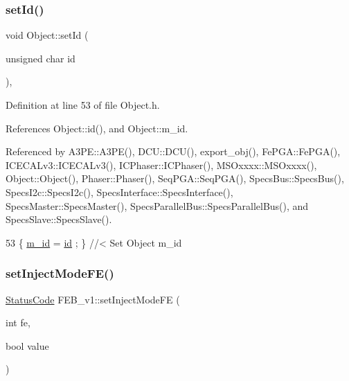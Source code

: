 \subsubsection{\texorpdfstring{set\+Id()}{setId()}}
{\footnotesize\ttfamily void Object\+::set\+Id (\begin{DoxyParamCaption}\item[{unsigned char}]{id }\end{DoxyParamCaption})\hspace{0.3cm}{\ttfamily [inline]}, {\ttfamily [inherited]}}



Definition at line 53 of file Object.\+h.



References Object\+::id(), and Object\+::m\+\_\+id.



Referenced by A3\+P\+E\+::\+A3\+P\+E(), D\+C\+U\+::\+D\+C\+U(), export\+\_\+obj(), Fe\+P\+G\+A\+::\+Fe\+P\+G\+A(), I\+C\+E\+C\+A\+Lv3\+::\+I\+C\+E\+C\+A\+Lv3(), I\+C\+Phaser\+::\+I\+C\+Phaser(), M\+S\+Oxxxx\+::\+M\+S\+Oxxxx(), Object\+::\+Object(), Phaser\+::\+Phaser(), Seq\+P\+G\+A\+::\+Seq\+P\+G\+A(), Specs\+Bus\+::\+Specs\+Bus(), Specs\+I2c\+::\+Specs\+I2c(), Specs\+Interface\+::\+Specs\+Interface(), Specs\+Master\+::\+Specs\+Master(), Specs\+Parallel\+Bus\+::\+Specs\+Parallel\+Bus(), and Specs\+Slave\+::\+Specs\+Slave().


\begin{DoxyCode}
53 \{ \hyperlink{classObject_aca74b9dbfed7b5556ea2d56c65b6b6b0}{m\_id}    = \hyperlink{classObject_af99145335cc61ff6e2798ea17db009d2}{id}    ; \} \textcolor{comment}{//< Set Object m\_id}
\end{DoxyCode}
\mbox{\label{classFEB__v1_aea3983d847c7b8053485ddd16af65680}} 
\subsubsection{\texorpdfstring{set\+Inject\+Mode\+F\+E()}{setInjectModeFE()}}
{\footnotesize\ttfamily \hyperlink{classStatusCode}{Status\+Code} F\+E\+B\+\_\+v1\+::set\+Inject\+Mode\+FE (\begin{DoxyParamCaption}\item[{int}]{fe,  }\item[{bool}]{value }\end{DoxyParamCaption})}



